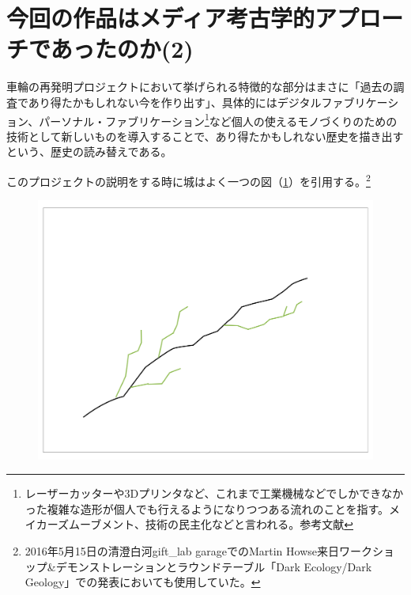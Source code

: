 \documentclass[a4paper,report]{jsbook}
\begin{document}
\section{今回の作品はメディア考古学的アプローチであったのか(2)}\label{ux4ecaux56deux306eux4f5cux54c1ux306fux30e1ux30c7ux30a3ux30a2ux8003ux53e4ux5b66ux7684ux30a2ux30d7ux30edux30fcux30c1ux3067ux3042ux3063ux305fux306eux304b2}

車輪の再発明プロジェクトにおいて挙げられる特徴的な部分はまさに「過去の調査であり得たかもしれない今を作り出す」、具体的にはデジタルファブリケーション、パーソナル・ファブリケーション\footnote{レーザーカッターや3Dプリンタなど、これまで工業機械などでしかできなかった複雑な造形が個人でも行えるようになりつつある流れのことを指す。メイカーズムーブメント、技術の民主化などと言われる。参考文献\autocite{fab:tanaka}}など個人の使えるモノづくりのための技術として新しいものを導入することで、あり得たかもしれない歴史を描き出すという、歴史の読み替えである。

このプロジェクトの説明をする時に城はよく一つの図（\cref{fig:leah}）を引用する。\footnote{2016年5月15日の清澄白河gift\_lab
  garageでのMartin
  Howse来日ワークショップ\&デモンストレーションとラウンドテーブル「Dark
  Ecology/Dark Geology」での発表においても使用していた。}\\
\autocite{soundstudies3}

\begin{figure}[htbp]
\centering
\includegraphics[width=1.00000\textwidth]{./img/leah_sideway.jpg}
\caption{\label{fig:leah}}
\end{figure}
\end{document}
